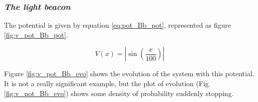 \documentclass[a4paper,12pt,twoside]{article}
\newcommand{\bracket}[1]{\left(#1\right)}
\newcommand{\abs}[1]{\left|#1\right|}
\begin{document}
    \subsubsection{\textit{The light beacon}}
      The potential is given by equation \eqref{eq:pot_Bb_pot}, represented as figure \ref{fig:v_pot_Bb_pot}.

      \begin{equation}
        V(x) = \abs{\sin\bracket{\frac{x}{100}}}
        \label{eq:pot_Bb_pot}
      \end{equation}

      Figure \ref{fig:v_pot_Bb_evo} shows the evolution of the system with this potential.
      It is not a really significant example, but the plot of evolution (Fig. \ref{fig:v_pot_Bb_evo}) shows some density of probability suddenly stopping.
\end{document}
